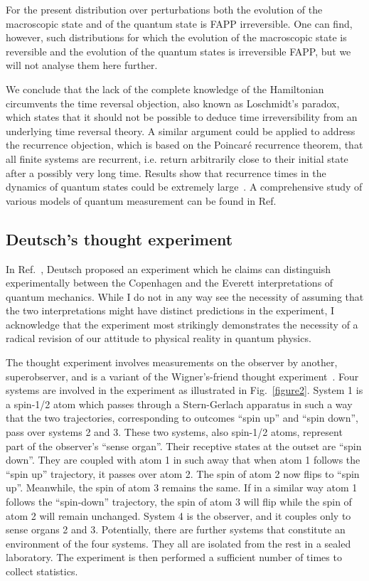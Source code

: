 \documentclass[12pt]{article}
\begin{document}
For the present distribution over perturbations both the evolution of the macroscopic state and of the quantum state is FAPP irreversible. One can find, however, such distributions for which the evolution of the macroscopic state is reversible and the evolution of the quantum states is irreversible FAPP, but we will not analyse them here further. 

We conclude that the lack of the complete knowledge of the Hamiltonian circumvents the time reversal objection, also known as Loschmidt's paradox, which states that it should not be possible to deduce time irreversibility from an underlying time reversal theory. A similar argument could be applied to address the recurrence objection, which is based on the Poincar{\' e} recurrence theorem, that all finite systems are recurrent, i.e. return arbitrarily close to their initial state after a possibly very long time. Results show that recurrence times in the dynamics of quantum states could be extremely large~\cite{peres4}. A comprehensive study of various models of quantum measurement can be found in Ref.~\cite{balian}


\subsection*{Deutsch's thought experiment}

In Ref.~\cite{deutsch}, Deutsch proposed an experiment which he claims can distinguish experimentally between the Copenhagen and the Everett interpretations of quantum mechanics. While I do not in any way see the necessity of assuming that the two interpretations might have distinct predictions in the experiment, I acknowledge that the experiment most strikingly demonstrates the necessity of a radical revision of our attitude to physical reality in quantum physics.

The thought experiment involves measurements on the observer by another, superobserver, and is a variant of the Wigner's-friend thought experiment~\cite{wigner1}. Four systems are involved in the experiment as illustrated in Fig.~\ref{figure2}. System 1 is a spin-1/2 atom which passes through a Stern-Gerlach apparatus in such a way that the two trajectories, corresponding to outcomes ``spin up'' and ``spin down'', pass over systems 2 and 3. These two systems, also spin-1/2 atoms, represent part of the observer's ``sense organ''. Their receptive states at the outset are ``spin down''. They are coupled with atom 1 in such away that when  atom 1 follows the ``spin up'' trajectory, it passes over atom 2. The spin of atom 2 now flips to ``spin up''. Meanwhile, the spin of atom 3 remains the same. If in a similar way atom 1 follows the ``spin-down'' trajectory, the spin of atom 3 will flip while the spin of atom 2 will remain unchanged. System 4 is the observer, and it couples only to sense organs 2 and 3. Potentially, there are further systems that constitute an environment of the four systems. They all are isolated from the rest in a sealed laboratory. The experiment is then performed a sufficient number of times to collect statistics.
\end{document}
